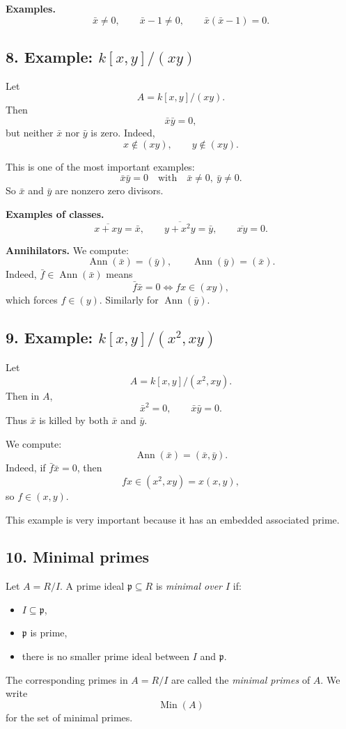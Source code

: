 \documentclass[12pt,a4paper,oneside]{report}
\DeclareMathOperator{\Ann}{Ann}
\DeclareMathOperator{\Min}{Min}
\theoremstyle{notespace}
\begin{document}
	\noindent
	\textbf{Examples.}
	\[
	\bar x\neq 0,\qquad \bar x-1\neq 0,\qquad \bar x(\bar x-1)=0.
	\]
	
	\subsection{8. Example: \(k[x,y]/(xy)\)}
	
	Let
	\[
	A=k[x,y]/(xy).
	\]
	Then
	\[
	\bar x\bar y=0,
	\]
	but neither \(\bar x\) nor \(\bar y\) is zero. Indeed,
	\[
	x\notin (xy),\qquad y\notin (xy).
	\]
	
	This is one of the most important examples:
	\[
	\bar x\bar y=0
	\quad\text{with}\quad
	\bar x\neq 0,\ \bar y\neq 0.
	\]
	So \(\bar x\) and \(\bar y\) are nonzero zero divisors.
	
	\medskip
	
	\noindent
	\textbf{Examples of classes.}
	\[
	\overline{x+xy}=\bar x,
	\qquad
	\overline{y+x^2y}=\bar y,
	\qquad
	\overline{xy}=0.
	\]
	
	\medskip
	
	\noindent
	\textbf{Annihilators.}
	We compute:
	\[
	\Ann(\bar x)=(\bar y),
	\qquad
	\Ann(\bar y)=(\bar x).
	\]
	Indeed, \(\bar f\in \Ann(\bar x)\) means
	\[
	\bar f\bar x=0
	\iff
	fx\in (xy),
	\]
	which forces \(f\in (y)\). Similarly for \(\Ann(\bar y)\).
	
	\subsection{9. Example: \(k[x,y]/(x^2,xy)\)}
	
	Let
	\[
	A=k[x,y]/(x^2,xy).
	\]
	Then in \(A\),
	\[
	\bar x^2=0,\qquad \bar x\bar y=0.
	\]
	Thus \(\bar x\) is killed by both \(\bar x\) and \(\bar y\).
	
	We compute:
	\[
	\Ann(\bar x)=(\bar x,\bar y).
	\]
	Indeed, if \(\bar f\bar x=0\), then
	\[
	fx\in (x^2,xy)=x(x,y),
	\]
	so \(f\in (x,y)\).
	
	This example is very important because it has an embedded associated prime.
	
	\subsection{10. Minimal primes}
	
	Let \(A=R/I\). A prime ideal \(\mathfrak p\subseteq R\) is \emph{minimal over \(I\)} if:
	\begin{itemize}
		\item \(I\subseteq \mathfrak p\),
		\item \(\mathfrak p\) is prime,
		\item there is no smaller prime ideal between \(I\) and \(\mathfrak p\).
	\end{itemize}
	The corresponding primes in \(A=R/I\) are called the \emph{minimal primes} of \(A\). We write
	\[
	\Min(A)
	\]
	for the set of minimal primes.
	
\end{document}
